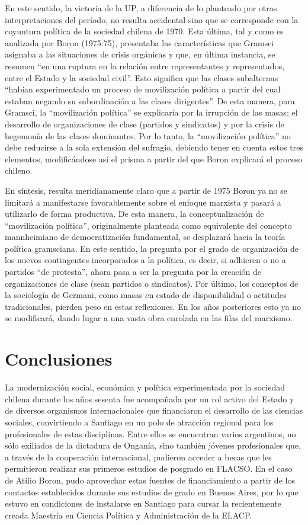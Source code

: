 En este sentido, la victoria de la UP, a diferencia de lo planteado por otras interpretaciones del período, no resulta accidental sino que se corresponde con la coyuntura política de la sociedad chilena de 1970. Esta última, tal y como es analizada por Boron (1975:75), presentaba las características que Gramsci asignaba a las situaciones de crisis orgánicas y que, en última instancia, se resumen ``en una ruptura en la relación entre representantes y representados, entre el Estado y la sociedad civil''. Esto significa que las clases subalternas ``habían experimentado un proceso de movilización política a partir del cual estaban negando su subordinación a las clases dirigentes''. De esta manera, para Gramsci, la ``movilización política'' se explicaría por la irrupción de las masas; el desarrollo de organizaciones de clase (partidos y sindicatos) y por la crisis de hegemonía de las clases dominantes. Por lo tanto, la ``movilización política'' no debe reducirse a la sola extensión del sufragio, debiendo tener en cuenta estos tres elementos, modificándose así el prisma a partir del que Boron explicará el proceso chileno.

En síntesis, resulta meridianamente claro que a partir de 1975 Boron ya no se limitará a manifestarse favorablemente sobre el enfoque marxista y pasará a utilizarlo de forma productiva. De esta manera, la conceptualización de ``movilización política'', originalmente planteada como equivalente del concepto mannheimiano de democratización fundamental, se desplazará hacia la teoría política gramsciana. En este sentido, la pregunta por el grado de organización de los nuevos contingentes incorporados a la política, es decir, si adhieren o no a partidos ``de protesta'', ahora pasa a ser la pregunta por la creación de organizaciones de clase (sean partidos o sindicatos). Por último, los conceptos de la sociología de Germani, como masas en estado de disponibilidad o actitudes tradicionales, pierden peso en estas reflexiones. En los años posteriores esto ya no se modificará, dando lugar a una vasta obra enrolada en las filas del marxismo.

\section{Conclusiones}

La modernización social, económica y política experimentada por la sociedad chilena durante los años sesenta fue acompañada por un rol activo del Estado y de diversos organismos internacionales que financiaron el desarrollo de las ciencias sociales, convirtiendo a Santiago en un polo de atracción regional para los profesionales de estas disciplinas. Entre ellos se encuentran varios argentinos, no sólo exiliados de la dictadura de Onganía, sino también jóvenes profesionales que, a través de la cooperación internacional, pudieron acceder a becas que les permitieron realizar sus primeros estudios de posgrado en FLACSO. En el caso de Atilio Boron, pudo aprovechar estas fuentes de financiamiento a partir de los contactos establecidos durante sus estudios de grado en Buenos Aires, por lo que estuvo en condiciones de instalarse en Santiago para cursar la recientemente creada Maestría en Ciencia Política y Administración de la ELACP.

